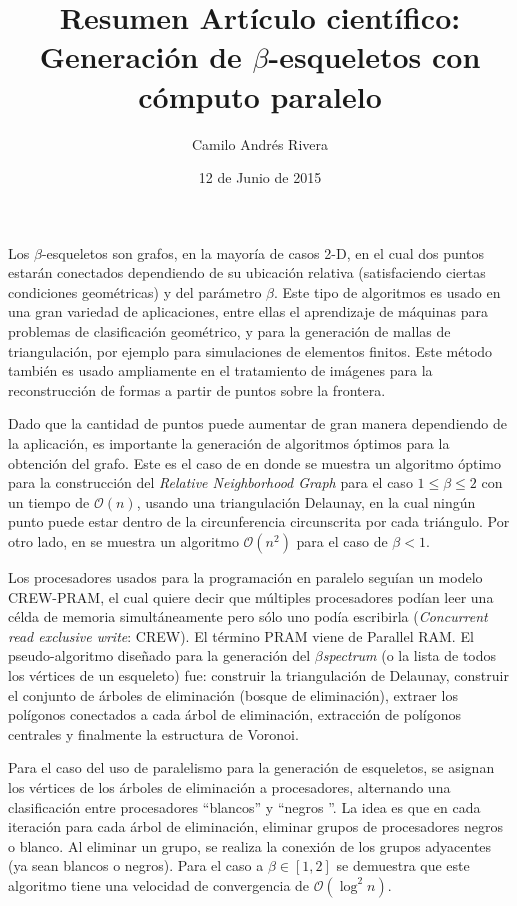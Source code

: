 \documentclass{article}
\title{Resumen Artículo científico: Generación de $\beta$-esqueletos con cómputo paralelo \cite{beta}}
\author{Camilo Andrés Rivera}
\date{12 de Junio de 2015}
\begin{document}
\maketitle

Los $\beta$-esqueletos son grafos, en la mayoría de casos 2-D, en el cual dos puntos estarán conectados dependiendo de su ubicación relativa (satisfaciendo ciertas condiciones geométricas) y del parámetro $\beta$. Este tipo de algoritmos es usado en una gran variedad de aplicaciones, entre ellas el aprendizaje de máquinas para problemas de clasificación geométrico, y para la generación de mallas de triangulación, por ejemplo para simulaciones de elementos finitos. Este método también es usado ampliamente en el tratamiento de imágenes para la reconstrucción de formas a partir de puntos sobre la frontera.

Dado que la cantidad de puntos puede aumentar de gran manera dependiendo de la aplicación, es importante la generación de algoritmos óptimos para la obtención del grafo. Este es el caso de \cite{unoados} en donde se muestra un algoritmo óptimo para la construcción del \textit{Relative Neighborhood Graph} para el caso $1\leq\beta\leq2$ con un tiempo de $\mathcal{O}(n)$, usando una triangulación Delaunay, en la cual ningún punto puede estar dentro de la circunferencia circunscrita por cada triángulo. Por otro lado, en \cite{menosdeuno}  se muestra un algoritmo $\mathcal{O}(n^2)$ para el caso de $\beta<1$.

Los procesadores usados para la programación en paralelo seguían un modelo CREW-PRAM, el cual quiere decir que múltiples procesadores podían leer una célda de memoria simultáneamente pero sólo uno podía escribirla (\textit{Concurrent read exclusive write}: CREW). El término PRAM viene de Parallel RAM. El pseudo-algoritmo diseñado para la generación del $\beta$\textit{spectrum} (o la lista de todos los vértices de un esqueleto) fue: construir la triangulación de Delaunay, construir el conjunto de árboles de eliminación (bosque de eliminación), extraer los polígonos conectados a cada árbol de eliminación, extracción de polígonos centrales y finalmente la estructura de Voronoi.

Para el caso del uso de paralelismo para la generación de esqueletos, se asignan los vértices de los árboles de eliminación a procesadores, alternando una clasificación entre procesadores ``blancos'' y ``negros ''. La idea es que en cada iteración para cada árbol de eliminación, eliminar grupos de procesadores negros o blanco. Al eliminar un grupo, se realiza la conexión de los grupos adyacentes (ya sean blancos o negros). Para el caso a $\beta\in[1,2]$ se demuestra que este algoritmo tiene una velocidad de convergencia de $\mathcal{O}(\log^2n)$.



\end{document}
